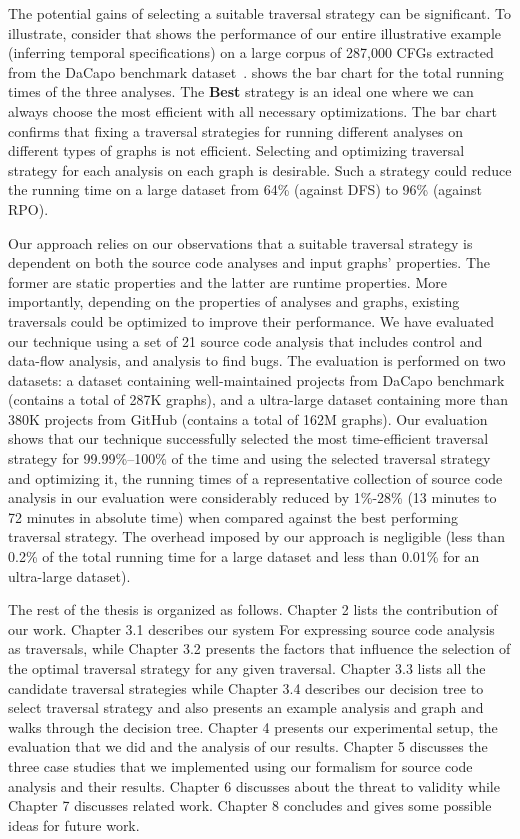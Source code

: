 The potential gains of selecting a suitable traversal strategy can be 
significant.
To illustrate, consider  that shows the performance of 
our entire illustrative example (inferring temporal specifications) on a 
large corpus of 287,000 CFGs extracted from the DaCapo
benchmark dataset~\cite{blackburn2006dacapo}.
 shows the 
bar chart for the total running times of the three analyses. The \textbf{Best}
 strategy is an ideal one where we can always choose the most efficient with 
all necessary optimizations. The bar chart confirms that fixing a traversal 
strategies for running different analyses on different types of graphs is not 
efficient. Selecting and optimizing traversal strategy for each analysis on 
each graph is desirable. Such a strategy could reduce the running time on a 
large dataset from 64\% (against DFS) to 96\% (against RPO).

Our approach relies on our observations that a suitable traversal strategy is
dependent on both the source code analyses and input graphs' properties.
The former are static properties and the latter are runtime properties.
More importantly, depending on the properties of analyses and graphs, existing
traversals could be optimized to improve their performance.  
We have evaluated our technique using a set of 21 source code analysis that
includes control and data-flow analysis, and analysis to find bugs. The
evaluation is performed on two datasets: a dataset containing well-maintained
projects from DaCapo benchmark (contains a total of 287K graphs), and a
ultra-large dataset containing more than 380K projects from GitHub (contains a
total of 162M graphs). Our evaluation shows that our technique successfully selected
the most time-efficient traversal strategy for 99.99\%--100\% of the time and
using the selected traversal strategy and optimizing it, the running times of a
representative collection of source code analysis in our evaluation
were considerably reduced by 1\%-28\% (13 minutes to 72 minutes in absolute time) when compared against the best performing traversal strategy.
The overhead imposed by our approach is negligible (less than 0.2\% of the total 
running time for a large dataset and less than 0.01\% for an ultra-large dataset). 

The rest of the thesis is organized as follows. Chapter 2 lists the contribution of our work. Chapter 3.1 describes our system For expressing source code analysis as traversals, while Chapter 3.2 presents the factors that influence the selection of the optimal traversal strategy for any given traversal. Chapter 3.3 lists all the candidate traversal strategies while Chapter 3.4 describes our decision tree to select traversal strategy and also presents an example analysis and graph and walks through the decision tree. Chapter 4 presents our experimental setup, the evaluation that we did and the analysis of our results. Chapter 5 discusses the three case studies that we implemented using our formalism for source code analysis and their results. Chapter 6 discusses about the threat to validity while Chapter 7 discusses related work. Chapter 8 concludes and gives some possible ideas for future work.